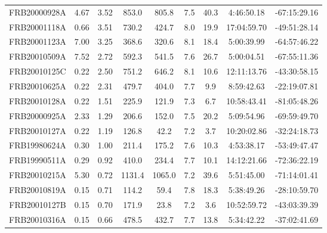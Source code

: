 \documentclass[11pt]{article}
\begin{document}
\begin{table}[htbp]
{\begin{tabular}{@{\extracolsep{\fill}}ccccccccc}
FRB20000928A & 4.67 & 3.52 & 853.0 & 805.8 & 7.5 & 40.3 & 4:46:50.18 & -67:15:29.16 \\ 
FRB20001118A & 0.66 & 3.51 & 730.2 & 424.7 & 8.0 & 19.9 & 17:04:59.70 & -49:51:28.14 \\ 
FRB20001123A & 7.00 & 3.25 & 368.6 & 320.6 & 8.1 & 18.4 & 5:00:39.99 & -64:57:46.22 \\ 
FRB20010509A & 7.52 & 2.72 & 592.3 & 541.5 & 7.6 & 26.7 & 5:00:04.51 & -67:55:11.36 \\ 
FRB20010125C & 0.22 & 2.50 & 751.2 & 646.2 & 8.1 & 10.6 & 12:11:13.76 & -43:30:58.15 \\ 
FRB20010625A & 0.22 & 2.31 & 479.7 & 404.0 & 7.7 & 9.9 & 8:59:42.63 & -22:19:07.81 \\ 
FRB20010128A & 0.22 & 1.51 & 225.9 & 121.9 & 7.3 & 6.7 & 10:58:43.41 & -81:05:48.26 \\ 
FRB20000925A & 2.33 & 1.29 & 206.6 & 152.0 & 7.5 & 20.2 & 5:09:54.96 & -69:59:49.70 \\ 
FRB20010127A & 0.22 & 1.19 & 126.8 & 42.2 & 7.2 & 3.7 & 10:20:02.86 & -32:24:18.73 \\ 
FRB19980624A & 0.30 & 1.00 & 211.4 & 175.2 & 7.6 & 10.3 & 4:53:38.17 & -53:49:47.47 \\ 
FRB19990511A & 0.29 & 0.92 & 410.0 & 234.4 & 7.7 & 10.1 & 14:12:21.66 & -72:36:22.19 \\ 
FRB20010215A & 5.30 & 0.72 & 1131.4 & 1065.0 & 7.2 & 39.6 & 5:51:45.00 & -71:14:01.41 \\ 
FRB20010819A & 0.15 & 0.71 & 114.2 & 59.4 & 7.8 & 18.3 & 5:38:49.26 & -28:10:59.70 \\ 
FRB20010127B & 0.15 & 0.70 & 171.9 & 23.8 & 7.2 & 3.6 & 10:52:59.72 & -43:03:39.39 \\ 
FRB20010316A & 0.15 & 0.66 & 478.5 & 432.7 & 7.7 & 13.8 & 5:34:42.22 & -37:02:41.69 \\ 
\hline
\end{tabular}
}
\end{table}
\end{document}
